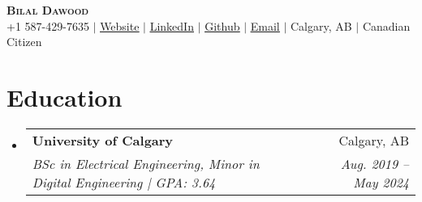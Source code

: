 \documentclass[A4,10pt]{article}
\makeatletter
\newcommand{\resumeSubheading}[4]{
  \vspace{-2pt}\item
    \begin{tabular*}{0.97\textwidth}[t]{l@{\extracolsep{\fill}}r}
      \textbf{#1} & #2 \\
      \textit{\small#3} & \textit{\small #4} \\
    \end{tabular*}\vspace{-7pt}
}
\newcommand{\resumeSubHeadingListStart}{\begin{itemize}[leftmargin=0.15in, label={}]}
\newcommand{\resumeSubHeadingListEnd}{\end{itemize}}
\makeatother
\begin{document}

\begin{center}
    \textbf{\Huge \scshape Bilal Dawood} \\ \vspace{1pt}
    \small +1 587-429-7635 $|$ \href{https://bilaldawood01.github.io}{\underline{Website}} $|$ 
    \href{https://linkedin.com/in/bilal-dawood-2021}{\underline{LinkedIn}} $|$
    \href{https://github.com/BilalDawood01}{\underline{Github}} $|$
    \href{mailto:bilaldawood099@outlook.com}{\underline{Email}} $|$
\small{Calgary, AB} $|$ 
\small{Canadian Citizen}
\end{center}


\section{Education}
\resumeSubHeadingListStart
    
    \resumeSubheading
      {University of Calgary}{Calgary, AB}
      {BSc in Electrical Engineering, Minor in Digital Engineering | GPA: 3.64}{Aug. 2019 -- May 2024}

  \resumeSubHeadingListEnd
\end{document}
